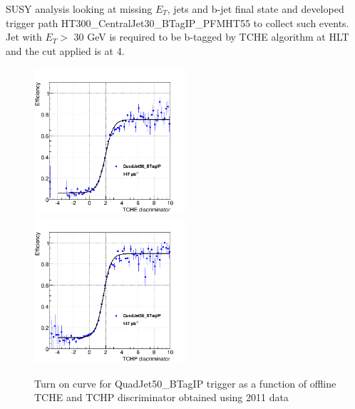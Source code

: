 SUSY analysis looking at missing $E_T$, jets and b-jet final state and
developed trigger path HT300\_CentralJet30\_BTagIP\_PFMHT55 to collect
such events. Jet with $E_T >$ 30 GeV is required to be b-tagged by
TCHE algorithm at HLT and the cut applied is at 4.

\begin{figure}[h!]
\centering
\includegraphics[width=0.5\textwidth]{figures/QuadBTagTCHE_turnOn.png}
\includegraphics[width=0.5\textwidth]{figures/QuadBTagTCHP_turnOn.png}
\caption{Turn on curve for QuadJet50\_BTagIP trigger as a function of offline TCHE and TCHP
  discriminator obtained using 2011 data}
\label{fig:QuadJetturnon}
\end{figure}

